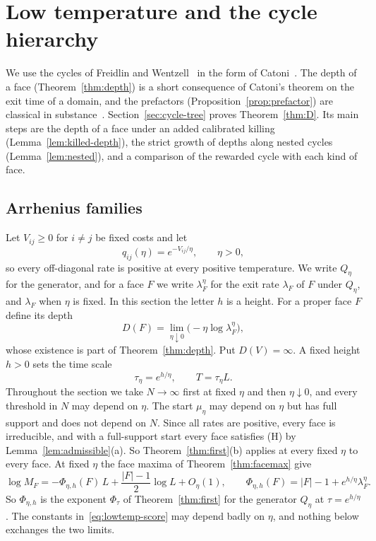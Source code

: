 \section{Low temperature and the cycle hierarchy}\label{sec:lowtemp}

We use the cycles of Freidlin and Wentzell~\cite{freidlinwentzell2012} in the
form of Catoni~\cite{catoni1999}. The depth of a face
(Theorem~\ref{thm:depth}) is a short consequence of Catoni's theorem on the
exit time of a domain, and the prefactors (Proposition~\ref{prop:prefactor})
are classical in substance~\cite{wentzell1972}. Section~\ref{sec:cycle-tree} proves
Theorem~\ref{thm:D}. Its main steps are the depth of a face under an added calibrated
killing (Lemma~\ref{lem:killed-depth}), the strict growth of depths along nested cycles
(Lemma~\ref{lem:nested}), and a comparison of the rewarded cycle with each kind of face.

\subsection{Arrhenius families}\label{sec:arrhenius}

Let $V_{ij}\ge0$ for $i\ne j$ be fixed costs and let
\[
 q_{ij}(\eta)=e^{-V_{ij}/\eta},\qquad \eta>0,
\]
so every off-diagonal rate is positive at every positive temperature. We
write $Q_\eta$ for the generator, and for a face $F$ we write $\lambda^\eta_F$
for the exit rate $\lambda_F$ of $F$ under $Q_\eta$, and $\lambda_F$ when $\eta$ is fixed. In this section the
letter $h$ is a height. For a proper face $F$ define
its depth
\[
 D(F)=\lim_{\eta\downarrow0}\bigl(-\eta\log \lambda^\eta_F\bigr),
\]
whose existence is part of Theorem~\ref{thm:depth}. Put $D(V)=\infty$. A fixed
height $h>0$ sets the time scale
\[
 \tau_\eta=e^{h/\eta},\qquad T=\tau_\eta L.
\]
Throughout the section we take $N\to\infty$ first at fixed $\eta$ and then
$\eta\downarrow0$, and every threshold in $N$ may depend on $\eta$. The start
$\mu_\eta$ may depend on $\eta$ but has full support and does not depend on
$N$. Since all rates are positive, every face is irreducible, and with a
full-support start every face satisfies (H) by Lemma~\ref{lem:admissible}(a).
So Theorem~\ref{thm:first}(b) applies at every fixed $\eta$ to every face.
At fixed $\eta$ the face maxima of Theorem~\ref{thm:facemax} give
\begin{equation}\label{eq:lowtemp-score}
 \log M_F=-\Phi_{\eta,h}(F)\,L+\frac{|F|-1}2\log L+O_\eta(1),\qquad
 \Phi_{\eta,h}(F)=|F|-1+e^{h/\eta}\lambda^\eta_F.
\end{equation}
So $\Phi_{\eta,h}$ is the exponent $\Phi_\tau$ of Theorem~\ref{thm:first} for the
generator $Q_\eta$ at $\tau=e^{h/\eta}$. The constants in~\eqref{eq:lowtemp-score}
may depend badly on $\eta$, and nothing below exchanges the two limits.

